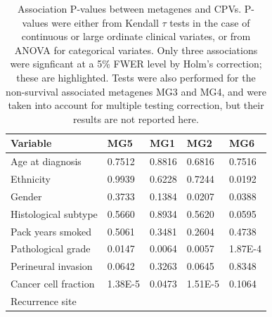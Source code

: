 \documentclass[dissertation.tex]{subfiles}
\begin{document}
\begin{table}[h]
\caption{Association P-values between metagenes and \glspl{CPV}.  P-values were either from Kendall $\tau$ tests in the case of continuous or large ordinate clinical variates, or from ANOVA for categorical variates.  Only three associations were signficant at a 5\% FWER level by Holm's correction; these are highlighted.  Tests were also performed for the non-survival associated metagenes MG3 and MG4, and were taken into account for multiple testing correction, but their results are not reported here.\label{tab:sigs-mg-cpvs}}
\center
\begin{tabular}{@{}l@{\qquad}ll@{\qquad\quad}ll@{}}
\toprule
Variable                   & MG5                             & MG1    & MG2                             & MG6                             \\ \midrule
Age at diagnosis           & 0.7512                          & 0.8816 & 0.6816                          & 0.7516                          \\
Ethnicity                  & 0.9939                          & 0.6228 & 0.7244                          & 0.0192                          \\
Gender                     & 0.3733                          & 0.1384 & 0.0207                          & 0.0388                          \\
Histological subtype       & 0.5660                          & 0.8934 & 0.5620                          & 0.0595                          \\
Pack years smoked          & 0.5061                          & 0.3481 & 0.2604                          & 0.4738                          \\
Pathological grade         & 0.0147                          & 0.0064 & 0.0057                          & \cellcolor[HTML]{C0C0C0}1.87E-4 \\
Perineural invasion        & 0.0642                          & 0.3263 & 0.0645                          & 0.8348                          \\
Cancer cell fraction       & \cellcolor[HTML]{C0C0C0}1.38E-5 & 0.0473 & \cellcolor[HTML]{C0C0C0}1.51E-5 & 0.1064                          \\
Recurrence site            &                                 &        &                                 &                                 \\

\end{tabular}
\end{table}
\end{document}
